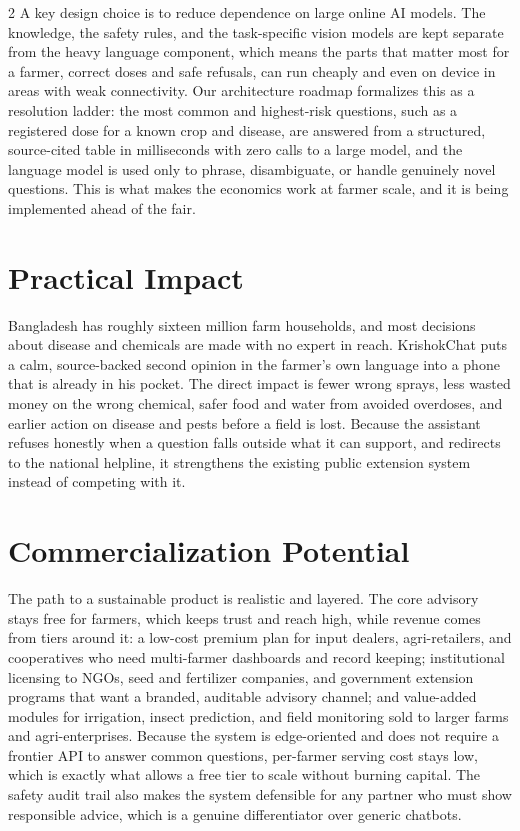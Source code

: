 \documentclass[11pt]{article}
\begin{document}
\begin{multicols}{2}
A key design choice is to reduce dependence on large online AI models. The knowledge, the safety rules, and the task-specific vision models are kept separate from the heavy language component, which means the parts that matter most for a farmer, correct doses and safe refusals, can run cheaply and even on device in areas with weak connectivity. Our architecture roadmap formalizes this as a resolution ladder: the most common and highest-risk questions, such as a registered dose for a known crop and disease, are answered from a structured, source-cited table in milliseconds with zero calls to a large model, and the language model is used only to phrase, disambiguate, or handle genuinely novel questions. This is what makes the economics work at farmer scale, and it is being implemented ahead of the fair.

\section{Practical Impact}

Bangladesh has roughly sixteen million farm households, and most decisions about disease and chemicals are made with no expert in reach. KrishokChat puts a calm, source-backed second opinion in the farmer's own language into a phone that is already in his pocket. The direct impact is fewer wrong sprays, less wasted money on the wrong chemical, safer food and water from avoided overdoses, and earlier action on disease and pests before a field is lost. Because the assistant refuses honestly when a question falls outside what it can support, and redirects to the national helpline, it strengthens the existing public extension system instead of competing with it.

\section{Commercialization Potential}

The path to a sustainable product is realistic and layered. The core advisory stays free for farmers, which keeps trust and reach high, while revenue comes from tiers around it: a low-cost premium plan for input dealers, agri-retailers, and cooperatives who need multi-farmer dashboards and record keeping; institutional licensing to NGOs, seed and fertilizer companies, and government extension programs that want a branded, auditable advisory channel; and value-added modules for irrigation, insect prediction, and field monitoring sold to larger farms and agri-enterprises. Because the system is edge-oriented and does not require a frontier API to answer common questions, per-farmer serving cost stays low, which is exactly what allows a free tier to scale without burning capital. The safety audit trail also makes the system defensible for any partner who must show responsible advice, which is a genuine differentiator over generic chatbots.


\end{multicols}
\end{document}
